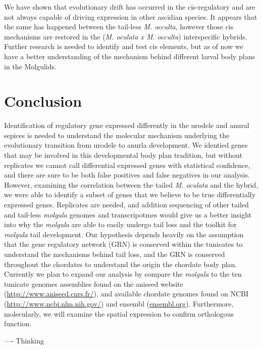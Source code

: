 We have shown that evolutionary drift has occurred in the cis-regulatory and are not always capable of driving expression in other ascidian species. It appears that the same has happened between the tail-less \textit{M. occulta}, however those cis mechanisms are restored in the (\textit{M. oculata x M. occulta}) interspecific hybrids. Further research is needed to identify and test cis elements, but as of now we have a better understanding of the mechanism behind different larval body plans in the Molgulids. 

\section{Conclusion}

Identification of regulatory gene expressed differently in the urodele and anural sepices is needed to understand the molecular mechanism underlying the evolutionary transition from urodele to anurla development. We identied genes that may be involved in this developmental body plan tradition, but without replicates we cannot call differential expressed genes with statistical confidence, and there are sure to be both false positives and false negatives in our analysis. However, examining the correlation between the tailed \textit{M. oculata} and the hybrid, we were able to identify a subset of genes that we believe to be true differentially expressed genes. Replicates are needed, and addition sequencing of other tailed and tail-less \textit{molgula} genomes and transcripotmes would give us a better insight into why the \textit{molgula} are able to easily undergo tail loss and the toolkit for \textit{molgula} tail development. Our hypothesis depends heavily on the assumption that the gene regulatory network (GRN) is conserved within the tunicates to understand the mechanisms behind tail loss, and the GRN is conserved throughout the chordates to understand the origin the chordate body plan. Currently we plan to expand our analysis by compare the \textit{molgula} to the ten tunicate genomes assemblies found on the aniseed website (\url{http://www.aniseed.cnrs.fr/}), and available chordate genomes found on NCBI (\url{http://www.ncbi.nlm.nih.gov/}) and ensembl (\url{ensembl.org}). Furthermore, molecularly, we will examine the spatial expression to confirm orthologous function.  


---- Thinking


